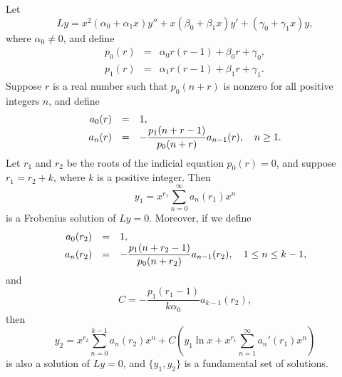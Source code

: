 \setcounter{theorem}{0}
\setcounter{equation}{1}
\begin{theorem}
  \label{thmtype:7.7.1} Let
  \[
    Ly= x^{2}(\alpha_{0}+\alpha_{1}x)y''+x(\beta_{0}+\beta_{1}x)y' +(\gamma_{0}+\gamma_{1}x)y,
  \]
  where $\alpha_{0}\ne0$, and define
  \begin{eqnarray*}
    p_{0}(r) & = & \alpha_{0}r(r-1)+\beta_{0}r+\gamma_{0}, \\[5pt]
    p_{1}(r) & = & \alpha_{1}r(r-1)+\beta_{1}r+\gamma_{1}.
  \end{eqnarray*}
  Suppose $r$ is a real number such that $p_{0}(n+r)$ is nonzero for all positive integers $n$, and
  define
  \begin{equation}
    \label{eq:7.7.2}
    \begin{array}{rcl}
      a_{0}(r) & = & 1,                                                          \\
      a_{n}(r) & = & -\displaystyle\frac{p_{1}(n+r-1)}{p_{0}(n+r)}a_{n-1}(r),\quad n\ge1.
    \end{array}
  \end{equation}
  Let $r_{1}$ and $r_{2}$ be the roots of the indicial equation $p_{0}(r)=0$, and suppose
  $r_{1}=r_{2}+k$, where $k$ is a positive integer. Then
  \[
    y_{1}=x^{r_{1}}\sum_{n=0}^{\infty}a_{n}(r_{1})x^{n}
  \]
  is a Frobenius solution of $Ly=0$. Moreover, if we define
  \begin{equation}
    \label{eq:7.7.3}
    \begin{array}{rcl}
      a_{0}(r_{2}) & = & 1,                                                                              \\
      a_{n}(r_{2}) & = & -\displaystyle\frac{p_{1}(n+r_{2}-1)}{p_{0}(n+r_{2})}a_{n-1}(r_{2}),\quad 1\le n\le k-1,
    \end{array}
  \end{equation}
  and
  \begin{equation}
    \label{eq:7.7.4}C=-\frac{p_{1}(r_{1}-1)}{k\alpha_{0}}a_{k-1}(r_{2}),
  \end{equation}
  then
  \begin{equation}
    \label{eq:7.7.5}y_{2}=x^{r_{2}}\sum_{n=0}^{k-1}a_{n}(r_{2})x^{n}+C\left(y_{1}\ln x+x^{r_{1}}\sum_{n=1}^{\infty}a_{n}'(r_{1})x^{n}\right)
  \end{equation}
  is also a solution of $Ly=0$, and $\{y_{1},y_{2}\}$ is a fundamental set of solutions.
\end{theorem}

